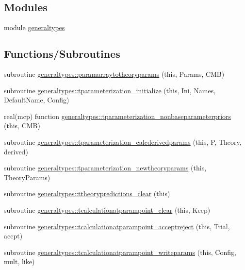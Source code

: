 \subsection*{Modules}
\begin{DoxyCompactItemize}
\item 
module \mbox{\hyperlink{namespacegeneraltypes}{generaltypes}}
\end{DoxyCompactItemize}
\subsection*{Functions/\+Subroutines}
\begin{DoxyCompactItemize}
\item 
subroutine \mbox{\hyperlink{namespacegeneraltypes_a416bb37c1c9b61ae49640747ff4b7630}{generaltypes\+::paramarraytotheoryparams}} (this, Params, C\+MB)
\item 
subroutine \mbox{\hyperlink{namespacegeneraltypes_a3ebde3fdac358126f25e067d6b223de1}{generaltypes\+::tparameterization\+\_\+initialize}} (this, Ini, Names, Default\+Name, Config)
\item 
real(mcp) function \mbox{\hyperlink{namespacegeneraltypes_ad583eb4db9430c5b495f21cc9863017d}{generaltypes\+::tparameterization\+\_\+nonbaseparameterpriors}} (this, C\+MB)
\item 
subroutine \mbox{\hyperlink{namespacegeneraltypes_afd268eae09678643a72d0b3ed8da568a}{generaltypes\+::tparameterization\+\_\+calcderivedparams}} (this, P, Theory, derived)
\item 
subroutine \mbox{\hyperlink{namespacegeneraltypes_a21288f1eff4120ed86e9b0bfce3eed50}{generaltypes\+::tparameterization\+\_\+newtheoryparams}} (this, Theory\+Params)
\item 
subroutine \mbox{\hyperlink{namespacegeneraltypes_a445b06716a45b37bc3100a23b2742d2e}{generaltypes\+::ttheorypredictions\+\_\+clear}} (this)
\item 
subroutine \mbox{\hyperlink{namespacegeneraltypes_ace116f1d7f9e8a3fdff59a6c376273e3}{generaltypes\+::tcalculationatparampoint\+\_\+clear}} (this, Keep)
\item 
subroutine \mbox{\hyperlink{namespacegeneraltypes_a4807ce873100fa001203158f5ed66fbd}{generaltypes\+::tcalculationatparampoint\+\_\+acceptreject}} (this, Trial, accpt)
\item 
subroutine \mbox{\hyperlink{namespacegeneraltypes_a2a8909b75d213ee335199e2fd1769711}{generaltypes\+::tcalculationatparampoint\+\_\+writeparams}} (this, Config, mult, like)
\item 

\end{DoxyCompactItemize}
